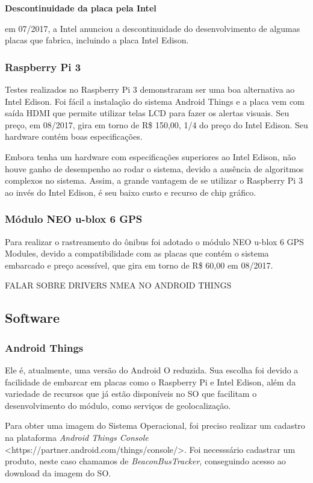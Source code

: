 \documentclass[
	12pt,				%
	oneside,			%
	a4paper,			%
	brazil				%
]{abntex2}
\begin{document}
{\textbf{Descontinuidade da placa pela Intel}

em 07/2017, a Intel anunciou a descontinuidade do desenvolvimento de algumas placas que fabrica, incluindo a placa Intel Edison.

\subsubsection{Raspberry Pi 3}

Testes realizados no Raspberry Pi 3 demonstraram ser uma boa alternativa ao Intel Edison. Foi fácil a instalação do sistema Android Things e a placa vem com saída HDMI que permite utilizar telas LCD para fazer os alertas visuais.
Seu preço, em 08/2017, gira em torno de R\$ 150,00, 1/4 do preço do Intel Edison. Seu hardware contém boas especificações.

Embora tenha um hardware com especificações superiores ao Intel Edison, não houve ganho de desempenho ao rodar o sistema, devido a ausência de algoritmos complexos no sistema. Assim, a grande vantagem de se utilizar o Raspberry Pi 3 ao invés do Intel Edison, é seu baixo custo e recurso de chip gráfico.

\subsubsection{Módulo NEO u-blox 6 GPS}

Para realizar o rastreamento do ônibus foi adotado o módulo NEO u-blox 6 GPS Modules, devido a compatibilidade com as placas que contém o sistema embarcado e preço acessível, que gira em torno de R\$ 60,00 em 08/2017.

FALAR SOBRE DRIVERS NMEA NO ANDROID THINGS

\subsection{Software}

\subsubsection{Android Things}

Ele é, atualmente, uma versão do Android O reduzida. Sua escolha foi devido a facilidade de embarcar em placas como o Raspberry Pi e Intel Edison, além da variedade de recursos que já estão disponíveis no SO que facilitam o desenvolvimento do módulo, como serviços de geolocalização. 

Para obter uma imagem do Sistema Operacional, foi preciso realizar um cadastro na plataforma \textit{Android Things Console} <https://partner.android.com/things/console/>. Foi necesssário cadastrar um produto, neste caso chamamos de \textit{BeaconBusTracker}, conseguindo acesso ao download da imagem do SO.

}
\end{document}
